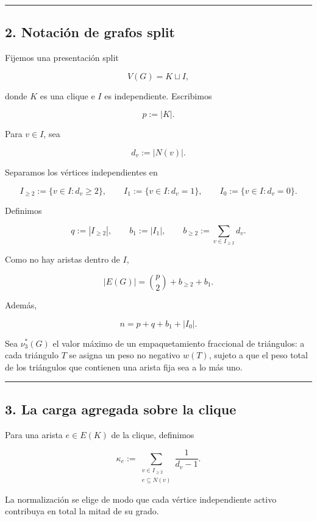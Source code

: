 \documentclass[spanish,11pt,a4paper]{article}
\begin{document}
\begin{center}\rule{0.5\linewidth}{0.5pt}\end{center}

\subsection{2. Notación de grafos
split}\label{notaciuxf3n-de-grafos-split}

Fijemos una presentación split

\[
V(G)=K\sqcup I,
\]

donde \(K\) es una clique e \(I\) es independiente. Escribimos

\[
p:=|K|.
\]

Para \(v\in I\), sea

\[
d_v:=|N(v)|.
\]

Separamos los vértices independientes en

\[
I_{\ge2}:=\{v\in I:d_v\ge2\},
\qquad
I_1:=\{v\in I:d_v=1\},
\qquad
I_0:=\{v\in I:d_v=0\}.
\]

Definimos

\[
q:=|I_{\ge2}|,
\qquad
b_1:=|I_1|,
\qquad
b_{\ge2}:=\sum_{v\in I_{\ge2}}d_v.
\]

Como no hay aristas dentro de \(I\),

\[
|E(G)|
=
\binom{p}{2}+b_{\ge2}+b_1.
\tag{2.1}
\]

Además,

\[
n=p+q+b_1+|I_0|.
\tag{2.2}
\]

Sea \(\nu_3^*(G)\) el valor máximo de un empaquetamiento fraccional de
triángulos: a cada triángulo \(T\) se asigna un peso no negativo
\(w(T)\), sujeto a que el peso total de los triángulos que contienen una
arista fija sea a lo más uno.

\begin{center}\rule{0.5\linewidth}{0.5pt}\end{center}

\subsection{3. La carga agregada sobre la
clique}\label{la-carga-agregada-sobre-la-clique}

Para una arista \(e\in E(K)\) de la clique, definimos

\[
\kappa_e
:=
\sum_{\substack{v\in I_{\ge2}\\ e\subseteq N(v)}}
\frac{1}{d_v-1}.
\tag{3.1}
\]

La normalización se elige de modo que cada vértice independiente activo
contribuya en total la mitad de su grado.
\end{document}
